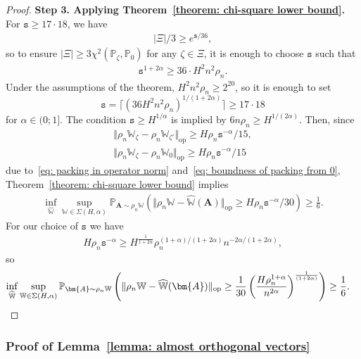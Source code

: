 \documentclass[11pt]{article}
\newcommand{\op}{\mathrm{op}}
\newcommand{\bA}{\bm{A}}
\newcommand{\bbW}{\mathbb{W}}
\newcommand{\bbP}{\mathbb{P}}
\newcommand{\<}{\langle}
\renewcommand{\>}{\rangle}
\newcommand{\ts}{\mathtt{s}}
\theoremstyle{plain}
\theoremstyle{definition}
\theoremstyle{remark}
\begin{document}
{\begin{proof}
\noindent \textbf{Step 3. Applying Theorem~\ref{theorem: chi-square lower bound}.} For $\ts \ge 17 \cdot 18$, we have
\begin{align*}
    |\Xi|/3 \ge e^{\ts / 36},
\end{align*}
so to ensure $|\Xi| \ge 3 \chi^2(\bbP_{\zeta}, \bbP_0)$ for any $\zeta \in \Xi$, it is enough to choose $\ts$ such that
\begin{align*}
    \ts^{1 + 2\alpha} \ge 36 \cdot H^2 n^2 \rho_n.
\end{align*}
Under the assumptions of the theorem, $H^2 n^2 \rho_n \ge 2^{20}$, so it is enough to set $$\ts = \lceil (36 H^2 n^2 \rho_n)^{1/(1 + 2 \alpha)} \rceil \ge 17 \cdot 18$$ for $\alpha \in (0; 1]$. The condition $\ts \ge H^{1/\alpha}$ is implied by $6 n \rho_n \ge H^{1/(2 \alpha)}$. Then, since
\begin{align*}
    \Vert \rho_n \bbW_{\zeta} - \rho_n \bbW_{\zeta'} \Vert_{\op} \ge H\rho_n \ts^{-\alpha} / 15, \\
    \Vert \rho_n \bbW_{\zeta} - \rho_n \bbW_0 \Vert_{\op} \ge H \rho_n \ts^{-\alpha} / 15 
\end{align*}
due to~\eqref{eq: packing in operator norm} and~\eqref{eq: boundness of packing from 0}, Theorem~\ref{theorem: chi-square lower bound} implies
\begin{align*}
    \inf_{\widehat{\bbW}} \sup_{\bbW \in \Sigma(H, \alpha)} \bbP_{\bA \sim \rho_n \bbW} \left ( \Vert \rho_n \bbW - \widehat{ \bbW}(\bA) \Vert_{\op} \ge H \rho_n \ts^{-\alpha} / 30 \right ) \ge \frac{1}{6}.
\end{align*}
For our choice of $\ts$ we have
\begin{align*}
    H \rho_n \ts^{-\alpha} \ge  H^{\frac{1}{1 + 2 \alpha}} \rho_n^{(1 + \alpha)/(1 + 2 \alpha)} n^{- 2 \alpha/(1 + 2 \alpha)},
\end{align*}
so
\begin{align*}
    \inf_{\widehat{\bbW}} \sup_{\bbW \in \Sigma(H, \alpha)} \bbP_{\bA \sim \rho_n \bbW} \left ( \Vert \rho_n \bbW - \widehat{ \bbW}(\bA) \Vert_{\op} \ge \frac{1}{30} \left ( \frac{H \rho_n^{1 + \alpha}}{n^{2 \alpha}} \right )^{\frac{1}{(1 + 2 \alpha)}} \right ) \ge \frac{1}{6}. & \qedhere
\end{align*}
\end{proof}

\subsubsection{Proof of Lemma~\ref{lemma: almost orthogonal vectors}}
\label{section: vector packing lemma}

}
\end{document}
